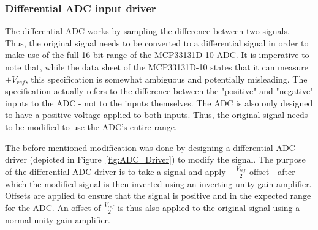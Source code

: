 \subsubsection{Differential ADC input driver}
\label{sec:D_ADC}
The differential ADC works by sampling the difference between two signals. Thus, the original signal needs to be converted to a differential signal in order to make use of the full 16-bit range of the MCP33131D-10 ADC. It is imperative to note that, while the data sheet of the MCP33131D-10 states that it can measure $\pm {V_{ref}}$, this specification is somewhat ambiguous and potentially misleading. The specification actually refers to the difference between the "positive" and "negative" inputs to the ADC - not to the inputs themselves. The ADC is also only designed to have a positive voltage applied to both inputs. Thus, the original signal needs to be modified  to use the ADC's entire range. 
\par
The before-mentioned modification was done by designing a differential ADC driver (depicted in Figure~\ref{fig:ADC_Driver}) to modify the signal. The purpose of the differential ADC driver is to take a signal and apply $-\frac{V_{ref}}{2}$ offset - after which the modified signal is then inverted using an inverting unity gain amplifier. Offsets are applied to ensure that the signal is positive and in the expected range for the ADC. An offset of $\frac{V_{ref}}{2}$ is thus also applied to the original signal using a normal unity gain amplifier. 
